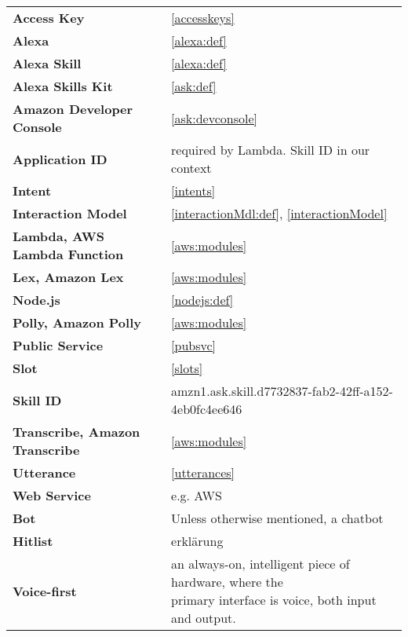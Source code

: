 \begin{flushleft}
\begin{tabular}{ll}

\textbf{Access Key}			&	 	\ref{accesskeys}\\


\textbf{Alexa}				&		\ref{alexa:def}\\
\textbf{Alexa Skill}		&		\ref{alexa:def}\\
\textbf{Alexa Skills Kit}	&		\ref{ask:def}\\
\textbf{Amazon Developer Console}&	\ref{ask:devconsole}\\

\textbf{Application ID}		&	required by Lambda. Skill ID in our context\\

\textbf{Intent}				&		\ref{intents}\\
\textbf{Interaction Model}	&		\ref{interactionMdl:def}, \ref{interactionModel}\\



\textbf{Lambda, AWS Lambda Function}	&		\ref{aws:modules}\\
\textbf{Lex, Amazon Lex}	&		\ref{aws:modules}\\

\textbf{Node.js}			&		\ref{nodejs:def}\\

\textbf{Polly, Amazon Polly}&		\ref{aws:modules}\\
\textbf{Public Service}			&	\ref{pubsvc}\\
\textbf{Slot}				&		\ref{slots}\\
\textbf{Skill ID}			&	amzn1.ask.skill.d7732837-fab2-42ff-a152-4eb0fc4ee646\\
\textbf{Transcribe, Amazon Transcribe}	&		\ref{aws:modules}\\

\textbf{Utterance}			&		\ref{utterances}\\



\textbf{Web Service}			&		e.g. AWS\\




\textbf{Bot}				&	Unless otherwise mentioned, a chatbot\\
\textbf{Hitlist}			&	erklärung\\
\textbf{Voice-first}		& \shortstack[l]{an always-on, intelligent piece of hardware, where the \\ primary interface is voice, both input and output.}\\



\end{tabular}
\end{flushleft}
